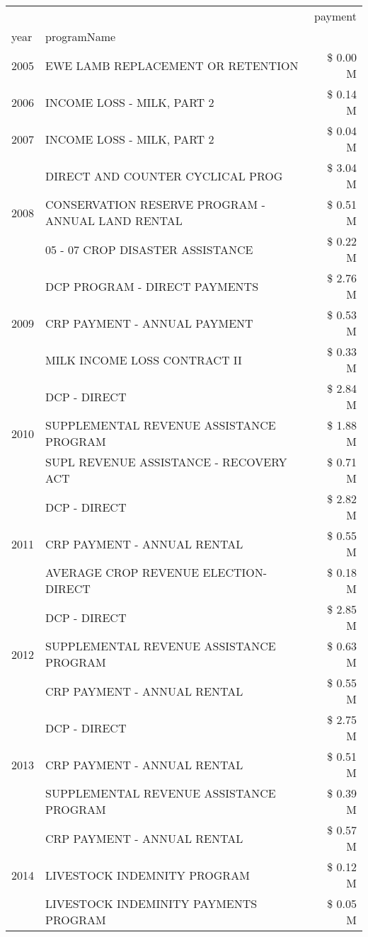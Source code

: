 \begin{tabular}{llr}
\toprule
 &  & payment \\
year & programName &  \\
\midrule
2005 & EWE LAMB REPLACEMENT OR RETENTION & \$ 0.00 M \\
\cline{1-3}
2006 & INCOME LOSS - MILK, PART 2 & \$ 0.14 M \\
\cline{1-3}
2007 & INCOME LOSS - MILK, PART 2 & \$ 0.04 M \\
\cline{1-3}
\multirow[t]{3}{*}{2008} & DIRECT AND COUNTER CYCLICAL PROG & \$ 3.04 M \\
 & CONSERVATION RESERVE PROGRAM - ANNUAL LAND RENTAL & \$ 0.51 M \\
 & 05 - 07 CROP DISASTER ASSISTANCE & \$ 0.22 M \\
\cline{1-3}
\multirow[t]{3}{*}{2009} & DCP PROGRAM - DIRECT PAYMENTS & \$ 2.76 M \\
 & CRP PAYMENT - ANNUAL PAYMENT & \$ 0.53 M \\
 & MILK INCOME LOSS CONTRACT II & \$ 0.33 M \\
\cline{1-3}
\multirow[t]{3}{*}{2010} & DCP - DIRECT & \$ 2.84 M \\
 & SUPPLEMENTAL REVENUE ASSISTANCE PROGRAM & \$ 1.88 M \\
 & SUPL REVENUE ASSISTANCE - RECOVERY ACT & \$ 0.71 M \\
\cline{1-3}
\multirow[t]{3}{*}{2011} & DCP - DIRECT & \$ 2.82 M \\
 & CRP PAYMENT - ANNUAL RENTAL & \$ 0.55 M \\
 & AVERAGE CROP REVENUE ELECTION-DIRECT & \$ 0.18 M \\
\cline{1-3}
\multirow[t]{3}{*}{2012} & DCP - DIRECT & \$ 2.85 M \\
 & SUPPLEMENTAL REVENUE ASSISTANCE PROGRAM & \$ 0.63 M \\
 & CRP PAYMENT - ANNUAL RENTAL & \$ 0.55 M \\
\cline{1-3}
\multirow[t]{3}{*}{2013} & DCP - DIRECT & \$ 2.75 M \\
 & CRP PAYMENT - ANNUAL RENTAL & \$ 0.51 M \\
 & SUPPLEMENTAL REVENUE ASSISTANCE PROGRAM & \$ 0.39 M \\
\cline{1-3}
\multirow[t]{3}{*}{2014} & CRP PAYMENT - ANNUAL RENTAL & \$ 0.57 M \\
 & LIVESTOCK INDEMNITY PROGRAM & \$ 0.12 M \\
 & LIVESTOCK INDEMINITY PAYMENTS PROGRAM & \$ 0.05 M \\
\cline{1-3}

\end{tabular}

